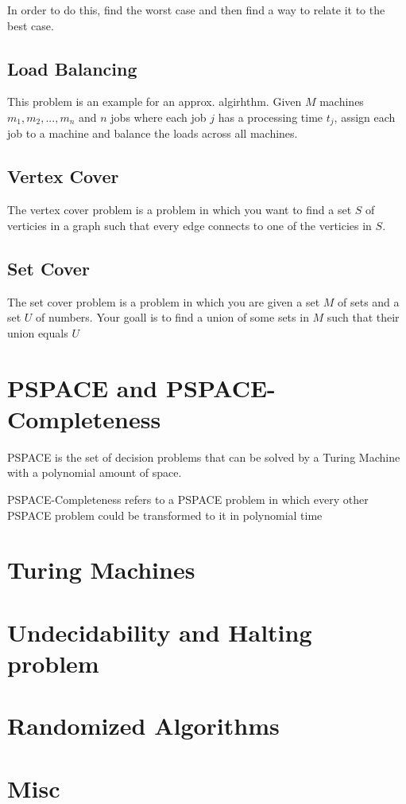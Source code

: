 \documentclass{article}
\begin{document}
In order to do this, find the worst case and then find a way to relate it to the best case.

\subsection{Load Balancing}
This problem is an example for an approx. algirhthm. Given $M$ machines $m_1, m_2, ..., m_n$ and $n$ jobs where each job $j$ has a processing time
$t_j$, assign each job to a machine and balance the loads across all machines.

\subsection{Vertex Cover}
The vertex cover problem is a problem in which you want to find a set $S$ of verticies in a graph such that
every edge connects to one of the verticies in $S$.

\subsection{Set Cover}
The set cover problem is a problem in which you are given a set $M$ of sets and a set $U$ of numbers. Your
goall is to find a union of some sets in $M$ such that their union equals $U$

\section{PSPACE and PSPACE-Completeness}
PSPACE is the set of decision problems that can be solved by a Turing Machine with a polynomial amount of
space. 

PSPACE-Completeness refers to a PSPACE problem in which every other PSPACE problem could be transformed to it in 
polynomial time

\section{Turing Machines}


\section{Undecidability and Halting problem}


\section{Randomized Algorithms}

\section{Misc}
\end{document}
